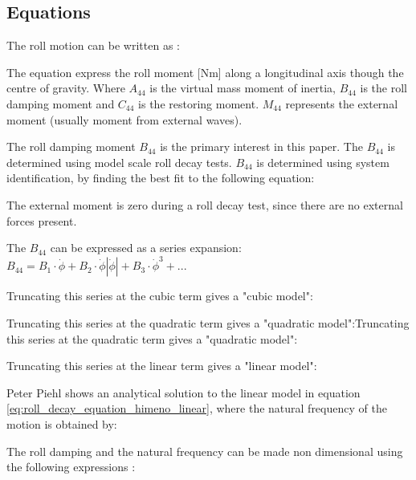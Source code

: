 \subsection{Equations}
\label{se:equations}
The roll motion can be written as \cite{himeno_prediction_1981}:


The equation express the roll moment [Nm] along a longitudinal axis though the centre of gravity.
Where $A_{44}$ is the virtual mass moment of inertia, $B_{44}$ is the roll damping moment and $C_{44}$ is the restoring moment. $M_{44}$ represents the external moment (usually moment from external waves).

The roll damping moment $B_{44}$ is the primary interest in this paper. The $B_{44}$ is determined using model scale roll decay tests. $B_{44}$ is determined using system identification, by finding the best fit to the following equation:

The external moment is zero during a roll decay test, since there are no external forces present.

The $B_{44}$ can be expressed as a series expansion:  
$ B_{44} = B_1\cdot\dot{\phi} + B_2\cdot\dot{\phi}\left|\dot{\phi}\right| + B_3\cdot\dot{\phi}^3 + ...$

Truncating this series at the cubic term gives a "cubic model":


Truncating this series at the quadratic term gives a "quadratic model":Truncating this series at the quadratic term gives a "quadratic model":


Truncating this series at the linear term gives a "linear model":


Peter Piehl \cite{henry_peter_piehl_ship_nodate} shows an analytical solution to the linear model in equation \ref{eq:roll_decay_equation_himeno_linear}, where the natural frequency of the motion is obtained by:


The roll damping and the natural frequency can be made non dimensional using the following expressions \cite{himeno_prediction_1981}: 



